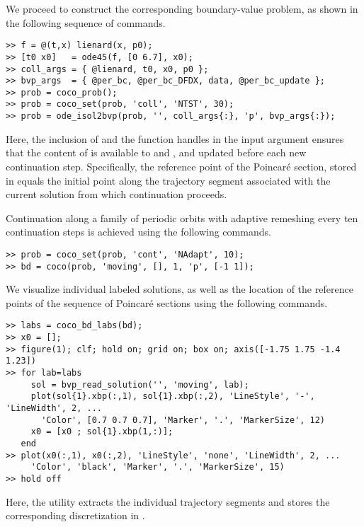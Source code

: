 We proceed to construct the corresponding boundary-value problem, as shown in the following sequence of commands.
\begin{lstlisting}[language=coco-highlight]
>> f = @(t,x) lienard(x, p0);
>> [t0 x0]   = ode45(f, [0 6.7], x0);
>> coll_args = { @lienard, t0, x0, p0 };
>> bvp_args  = { @per_bc, @per_bc_DFDX, data, @per_bc_update };
>> prob = coco_prob();
>> prob = coco_set(prob, 'coll', 'NTST', 30);
>> prob = ode_isol2bvp(prob, '', coll_args{:}, 'p', bvp_args{:});
\end{lstlisting}
Here, the inclusion of  and the  function handles in the  input argument ensures that the content of  is available to  and , and updated before each new continuation step. Specifically, the reference point of the Poincar\'{e} section, stored in  equals the initial point along the trajectory segment associated with the current solution from which continuation proceeds.

Continuation along a family of periodic orbits with adaptive remeshing every ten continuation steps is achieved using the following commands.
\begin{lstlisting}[language=coco-highlight]
>> prob = coco_set(prob, 'cont', 'NAdapt', 10);
>> bd = coco(prob, 'moving', [], 1, 'p', [-1 1]);
\end{lstlisting}
We visualize individual labeled solutions, as well as the location of the reference points of the sequence of Poincar\'{e} sections using the following commands.
\begin{lstlisting}[language=coco-highlight]
>> labs = coco_bd_labs(bd); 
>> x0 = [];
>> figure(1); clf; hold on; grid on; box on; axis([-1.75 1.75 -1.4 1.23])
>> for lab=labs
     sol = bvp_read_solution('', 'moving', lab);
     plot(sol{1}.xbp(:,1), sol{1}.xbp(:,2), 'LineStyle', '-', 'LineWidth', 2, ...
       'Color', [0.7 0.7 0.7], 'Marker', '.', 'MarkerSize', 12)
     x0 = [x0 ; sol{1}.xbp(1,:)];
   end
>> plot(x0(:,1), x0(:,2), 'LineStyle', 'none', 'LineWidth', 2, ...
     'Color', 'black', 'Marker', '.', 'MarkerSize', 15)
>> hold off
\end{lstlisting}
Here, the  utility extracts the individual trajectory segments and stores the corresponding discretization in .\\
\medskip

